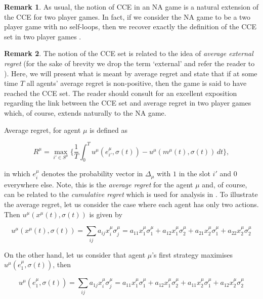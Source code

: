 \documentclass{article}
\theoremstyle{definition}
\newtheorem*{remark}{Remark}
\newcommand{\pure}[2]{e^{#1}_{#2}}
\begin{document}
	\begin{remark}
		As usual, the notion of CCE in an NA game is a natural extension of the CCE for two player
		games. In fact, if we consider the NA game to be a two player game with no self-loops, then
		we recover exactly the definition of the CCE set in two player games \cite{PayoffPerformance}.
	\end{remark}

	\begin{remark}
		The notion of the CCE set is related to the idea of \emph{average external regret} (for the
		sake of brevity we drop the term `external' and refer the reader to \cite{AGT}). Here, we
		will present what is meant by average regret and state that if at some time $T$ all agents'
		average regret is non-positive, then the game is said to have reached the CCE set. The
		reader should consult \cite{PayoffPerformance} for an excellent exposition regarding the
		link between the CCE set and average regret in two player games which, of course, extends
		naturally to the NA game.
		
		Average regret, for agent $\mu$ is defined as

		\begin{equation}
			R^{\mu} = \max_{i' \in S^\mu} \Big\{ \frac{1}{T} \int_{0}^{T} u^{\mu}(\pure{\mu}{i'}, \sigma(t)) - u^{\mu}(m^\mu(t), \sigma(t)) \, dt \Big\},
		\end{equation}
	
		in which $\pure{\mu}{i}$ denotes the probability vector in $\Delta_\mu$ with $1$ in the slot
		$i'$ and $0$ everywhere else. Note, this is the \emph{average regret} for the agent $\mu$
		and, of course, can be related to the \emph{cumulative regret} which is used for analysis
		in \cite{Leonardos and Piliouras, Cesa-Bianchi}.  To illustrate the average regret, let us
		consider the case where each agent has only two actions. Then $u^{\mu}(x^\mu(t), \sigma(t))$
		is given by
		
		\begin{equation}
			u^{\mu}(x^\mu(t), \sigma(t)) = \sum_{ij} a_{ij} x_i^\mu \sigma_j^\mu = a_{11} x_1^\mu \sigma_1^\mu + a_{12} x_1^\mu \sigma_2^\mu + a_{21} x_2^\mu \sigma_1^\mu + a_{22} x_2^\mu \sigma_2^\mu
		\end{equation}
	
		On the other hand, let us consider that agent $\mu$'s first strategy maximises $u^{\mu}(\pure{\mu}{1}, \sigma(t))$, then
	
		\begin{equation}
			u^{\mu}(\pure{\mu}{1}, \sigma(t)) = \sum_{ij} a_{1j} x_i^\mu \sigma_j^\mu = a_{11} x_1^\mu \sigma_1^\mu + a_{12} x_1^\mu \sigma_2^\mu + a_{11} x_2^\mu \sigma_1^\mu + a_{12} x_2^\mu \sigma_2^\mu 
		\end{equation}
	

\end{remark}
\end{document}
